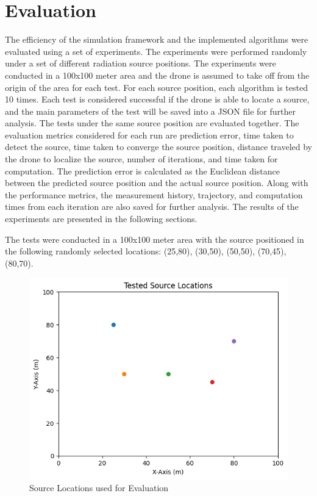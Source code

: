 \documentclass[../report.tex]{subfiles}
\begin{document}
    \section{Evaluation}
    \label{sec:evaluation}

    The efficiency of the simulation framework and the implemented algorithms were evaluated using a set of experiments. The experiments were performed randomly under a 
    set of different radiation source positions. The experiments were conducted in a 100x100 meter area and the drone is assumed to take off from
    the origin of the area for each test. For each source position, each algorithm is tested 10 times. Each test is considered successful if the drone is able to 
    locate a source, and the main parameters of the test will be saved into a JSON file for further analysis.  The tests under the same source position are evaluated
    together. The evaluation metrics considered for each run are prediction error, time taken to detect the source, time taken to converge the source position, 
    distance traveled by the drone to localize the source, number of iterations, and time taken for computation. The prediction error is calculated as the Euclidean
    distance between the predicted source position and the actual source position. Along with the performance metrics, the measurement history, trajectory, and computation times from each 
    iteration are also saved for further analysis. The results of the experiments are presented in the following sections.


    The tests were conducted in a 100x100 meter area with the source positioned in the following randomly selected locations: (25,80), (30,50), (50,50), (70,45), (80,70).
    \begin{figure}[ht]
        \centering
        \includegraphics[width=0.8\linewidth]{figures/source_locations.png}
        \caption{Source Locations used for Evaluation}
        \label{fig:figureexample}
    \end{figure}
\end{document}
